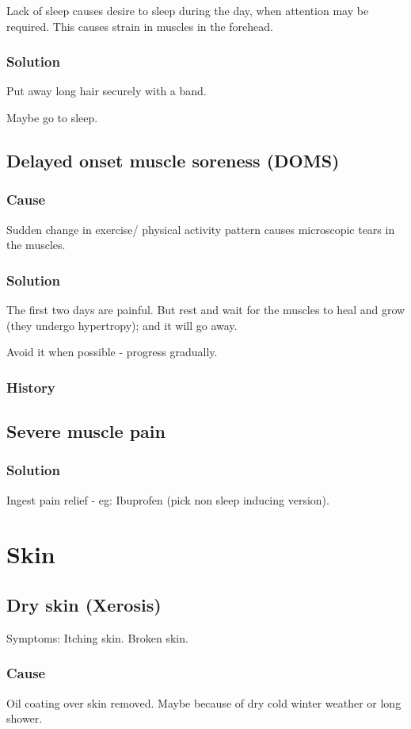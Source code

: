 \documentclass[oneside, article]{memoir}
\begin{document}
Lack of sleep causes desire to sleep during the day, when attention may be required. This causes strain in muscles in the forehead.

\subsection{Solution}
Put away long hair securely with a band.

Maybe go to sleep.

\section{Delayed onset muscle soreness (DOMS)}
\subsection{Cause}
Sudden change in exercise/ physical activity pattern causes microscopic tears in the muscles.

\subsection{Solution}
The first two days are painful. But rest and wait for the muscles to heal and grow (they undergo hypertropy); and it will go away.

Avoid it when possible - progress gradually.

\subsection{History}

\section{Severe muscle pain}
\subsection{Solution}
Ingest pain relief - eg: Ibuprofen (pick non sleep inducing version).

\chapter{Skin}
\section{Dry skin (Xerosis)}
Symptoms: Itching skin. Broken skin.
\subsection{Cause}
Oil coating over skin removed. Maybe because of dry cold winter weather or long shower.
\end{document}
